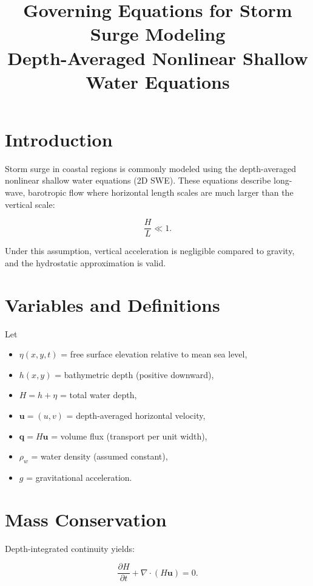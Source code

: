 \documentclass[11pt]{article}
\title{Governing Equations for Storm Surge Modeling\\
Depth-Averaged Nonlinear Shallow Water Equations}
\author{}
\date{}
\begin{document}
\maketitle

\section{Introduction}

Storm surge in coastal regions is commonly modeled using the depth-averaged nonlinear shallow water equations (2D SWE). These equations describe long-wave, barotropic flow where horizontal length scales are much larger than the vertical scale:

\[
\frac{H}{L} \ll 1.
\]

Under this assumption, vertical acceleration is negligible compared to gravity, and the hydrostatic approximation is valid.

\section{Variables and Definitions}

Let

\begin{itemize}
    \item $\eta(x,y,t)$ = free surface elevation relative to mean sea level,
    \item $h(x,y)$ = bathymetric depth (positive downward),
    \item $H = h + \eta$ = total water depth,
    \item $\bm{u} = (u,v)$ = depth-averaged horizontal velocity,
    \item $\bm{q} = H\bm{u}$ = volume flux (transport per unit width),
    \item $\rho_w$ = water density (assumed constant),
    \item $g$ = gravitational acceleration.
\end{itemize}

\section{Mass Conservation}

Depth-integrated continuity yields:

\begin{equation}
\frac{\partial H}{\partial t}
+
\nabla \cdot (H \bm{u})
=
0.
\end{equation}
\end{document}
